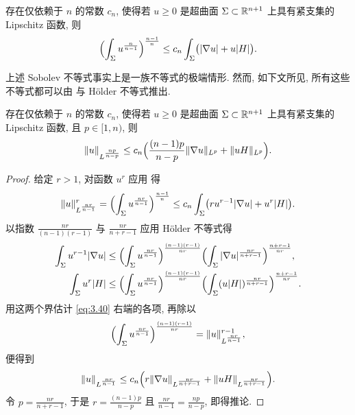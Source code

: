 \begin{theorem}
\label{thm:3.11}
存在仅依赖于 $n$ 的常数 $c_n$, 使得若 $u\geq0$ 是超曲面
$\Sigma\subset\mathbb{R}^{n+1}$ 上具有紧支集的 Lipschitz 函数, 则
\begin{equation}
\Bigl(\int_\Sigma u^{\frac{n}{n-1}}\Bigr)^{\frac{n-1}{n}}
 \leq c_n\int_\Sigma\bigl(|\nabla u|+u|H|\bigr).
\label{eq:3.38}
\end{equation}
\end{theorem}

上述 Sobolev 不等式事实上是一族不等式的极端情形. 然而, 如下文所见,
所有这些不等式都可以由 与 Hölder 不等式推出.

\begin{corollary}
\label{cor:3.12}
存在仅依赖于 $n$ 的常数 $c_n$, 使得若 $u\geq0$ 是超曲面
$\Sigma\subset\mathbb{R}^{n+1}$ 上具有紧支集的 Lipschitz 函数, 且 $p\in[1,n)$,
则
\begin{equation}
\|u\|_{L^{\frac{np}{n-p}}}
 \leq c_n\Bigl(\frac{(n-1)p}{n-p}\|\nabla u\|_{L^p}
 +\|uH\|_{L^p}\Bigr).
\label{eq:3.39}
\end{equation}
\end{corollary}

\begin{proof}
给定 $r>1$, 对函数 $u^r$ 应用 得
\begin{equation}
\|u\|_{L^{\frac{nr}{n-1}}}^r
 =\Bigl(\int_\Sigma u^{\frac{nr}{n-1}}\Bigr)^{\frac{n-1}{n}}
 \leq c_n\int_\Sigma\bigl(ru^{r-1}|\nabla u|+u^r|H|\bigr).
\label{eq:3.40}
\end{equation}
以指数 $\frac{nr}{(n-1)(r-1)}$ 与 $\frac{nr}{n+r-1}$ 应用 Hölder 不等式得
\[
\begin{aligned}
\int_\Sigma u^{r-1}|\nabla u|
&\leq\Bigl(\int_\Sigma u^{\frac{nr}{n-1}}\Bigr)^{\frac{(n-1)(r-1)}{nr}}
 \Bigl(\int_\Sigma|\nabla u|^{\frac{nr}{n+r-1}}\Bigr)^{\frac{n+r-1}{nr}},\\
\int_\Sigma u^r|H|
&\leq\Bigl(\int_\Sigma u^{\frac{nr}{n-1}}\Bigr)^{\frac{(n-1)(r-1)}{nr}}
 \Bigl(\int_\Sigma(u|H|)^{\frac{nr}{n+r-1}}\Bigr)^{\frac{n+r-1}{nr}}.
\end{aligned}
\]
用这两个界估计 \eqref{eq:3.40} 右端的各项, 再除以
\[
\Bigl(\int_\Sigma u^{\frac{nr}{n-1}}\Bigr)^{\frac{(n-1)(r-1)}{nr}}
 =\|u\|_{L^{\frac{nr}{n-1}}}^{r-1},
\]
便得到
\[
\|u\|_{L^{\frac{nr}{n-1}}}
 \leq c_n\Bigl(r\|\nabla u\|_{L^{\frac{nr}{n+r-1}}}
 +\|uH\|_{L^{\frac{nr}{n+r-1}}}\Bigr).
\]
令 $p=\frac{nr}{n+r-1}$, 于是 $r=\frac{(n-1)p}{n-p}$ 且
$\frac{nr}{n-1}=\frac{np}{n-p}$, 即得推论.
\end{proof}

